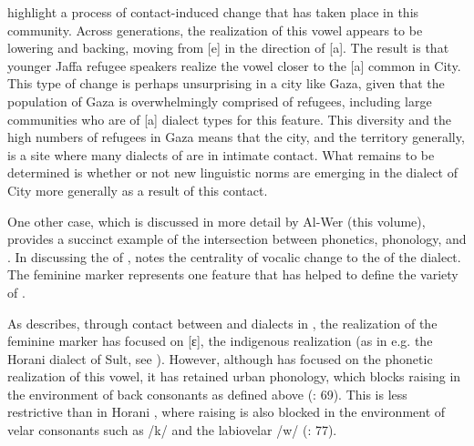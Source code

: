 \documentclass[output=paper]{langsci/langscibook}
\begin{document}
\citet{CotterHoresh2015} highlight a process of contact-induced change that has taken place in this community. Across generations, the realization of this vowel appears to be lowering and backing, moving from [e] in the direction of [a]. The result is that younger Jaffa refugee speakers realize the vowel closer to the [a] common in  City. This type of change is perhaps unsurprising in a city like Gaza, given that the population of Gaza is overwhelmingly comprised of refugees, including large communities who are of [a] dialect types for this feature. This diversity and the high numbers of refugees in Gaza means that the city, and the territory generally, is a site where many dialects of   are in intimate contact. What remains to be determined is whether or not new linguistic norms are emerging in the dialect of  City more generally as a result of this contact.

One other case, which is discussed in more detail by Al-Wer (this volume), provides a succinct example of the intersection between phonetics, phonology, and  . In discussing the  of  , \citet{Al-Wer2007} notes the centrality of vocalic change to the  of the dialect. The feminine  marker represents one feature that has helped to define the variety of . 

As \citet{Al-Wer2007} describes, through contact between  and   dialects in , the realization of the feminine  marker has focused on [ɛ], the indigenous  realization (as in e.g. the Horani dialect of Sult, see \citealt{Herin2014salt}). However, although   has focused on the  phonetic realization of this vowel, it has retained urban  phonology, which blocks raising in the environment of back consonants as defined above (\citealt{Al-Wer2007}: 69). This is less restrictive than in Horani , where raising is also blocked in the environment of velar consonants such as /k/ and the labiovelar /w/ (\citealt{Al-WerEtAl2015}: 77). 
\end{document}

